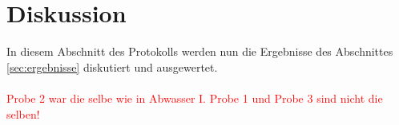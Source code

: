 \chapter{Diskussion}
\label{sec:diskussion}
In diesem Abschnitt des Protokolls werden nun die Ergebnisse des Abschnittes \ref{sec:ergebnisse} diskutiert und ausgewertet.\\\\


  

 






\textcolor{red}{Probe 2 war die selbe wie in Abwasser I. Probe 1 und Probe 3 sind nicht die selben!}


